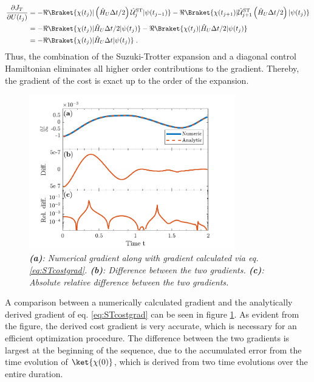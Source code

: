 \begin{align}
	\frac{\partial J_T}{\partial U (t_j)} &= - \Re \Braket{\chi (t_j) |   \left(  \hat{H}_U \Delta t /2 \right) \hat{\mathcal{U}}_{j}^{\mathrm{ST}} | \psi (t_{j-1})} - \Re \Braket{\chi (t_{j+1}) |  \hat{\mathcal{U}}_{j+1}^{\mathrm{ST}} \left(  \hat{H}_U \Delta t /2 \right) | \psi (t_{j})} \nonumber \\
	&= - \Re \Braket{\chi (t_j) |  \hat{H}_U \Delta t /2  | \psi (t_{j})} - \Re \Braket{\chi (t_{j}) |  \hat{H}_U \Delta t /2   | \psi (t_{j})} \nonumber \\
	&= - \Re \Braket{\chi (t_j) | \hat{H}_U \Delta t | \psi (t_{j})} \; . \label{eq:STcostgrad}
\end{align}  
Thus, the combination of the Suzuki-Trotter expansion and a diagonal control Hamiltonian eliminates all higher order contributions to the gradient. Thereby, the gradient of the cost is exact up to the order of the expansion.
\begin{figure}[!h]
    \centering
    \includegraphics[width=0.8\textwidth]{Figures/CompareGradientsGRAPE.pdf}
    \caption{\textit{\textbf{(a)}: Numerical gradient along with gradient calculated via eq. \eqref{eq:STcostgrad}. \textbf{(b)}: Difference between the two gradients. \textbf{(c)}: Absolute relative difference between the two gradients.}}
    \label{fig:CompareGradientsGRAPE}
\end{figure}
A comparison between a numerically calculated gradient and the analytically derived gradient of eq. \eqref{eq:STcostgrad} can be seen in figure \ref{fig:CompareGradientsGRAPE}. As evident from the figure, the derived cost gradient is very accurate, which is necessary for an efficient optimization procedure. The difference between the two gradients is largest at the beginning of the sequence, due to the accumulated error from the time evolution of $\ket{\chi (0)}$, which is derived from two time evolutions over the entire duration.


